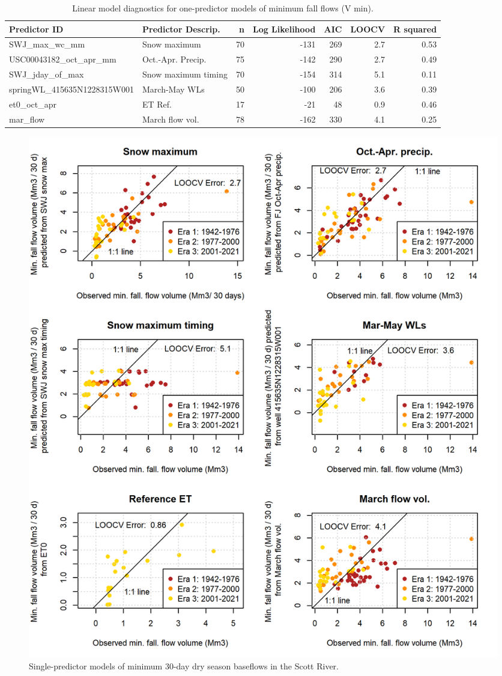 \documentclass[hess, manuscript]{copernicus}
\begin{document}
\begin{table}[ht]
\centering
\caption{Linear model diagnostics for one-predictor models of minimum fall flows (V min).} 
\label{tab:vmin_1_pred_tab}
\begin{tabular}{llrrrrr}
  \hline
Predictor ID & Predictor Descrip. & n & Log Likelihood & AIC & LOOCV & R squared \\ 
  \hline
SWJ\_max\_wc\_mm & Snow maximum & 70 & -131 & 269 & 2.7 & 0.53 \\ 
  USC00043182\_oct\_apr\_mm & Oct.-Apr. Precip. & 75 & -142 & 290 & 2.7 & 0.49 \\ 
  SWJ\_jday\_of\_max & Snow maximum timing & 70 & -154 & 314 & 5.1 & 0.11 \\ 
  springWL\_415635N1228315W001 & March-May WLs & 50 & -100 & 206 & 3.6 & 0.39 \\ 
  et0\_oct\_apr & ET Ref. & 17 & -21 & 48 & 0.9 & 0.46 \\ 
  mar\_flow & March flow vol. & 78 & -162 & 330 & 4.1 & 0.25 \\ 
   \hline
\end{tabular}
\end{table}

\begin{figure}
\includegraphics[width=1\linewidth]{f11} \caption{\label{fig:one_predictor_model} Single-predictor models of minimum 30-day dry season baseflows in the Scott River.}\label{fig:one_predictor_model}
\end{figure}
\end{document}
